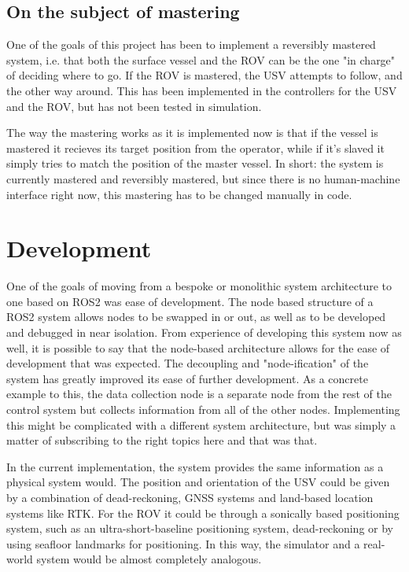 \documentclass[class=article, crop=false]{standalone}
\begin{document}
\subsection{On the subject of mastering}
One of the goals of this project has been to implement a reversibly mastered system, i.e. that both the surface vessel and the ROV can be the one "in charge" of deciding where to go. If the ROV is mastered, the USV attempts to follow, and the other way around. This has been implemented in the controllers for the USV and the ROV, but has not been tested in simulation.

The way the mastering works as it is implemented now is that if the vessel is mastered it recieves its target position from the operator, while if it's slaved it simply tries to match the position of the master vessel. In short: the system is currently mastered and reversibly mastered, but since there is no human-machine interface right now, this mastering has to be changed manually in code.

\section{Development}
One of the goals of moving from a bespoke or monolithic system architecture to one based on ROS2 was ease of development. The node based structure of a ROS2 system allows nodes to be swapped in or out, as well as to be developed and debugged in near isolation. From experience of developing this system now as well, it is possible to say that the node-based architecture allows for the ease of development that was expected. The decoupling and "node-ification" of the system has greatly improved its ease of further development. As a concrete example to this, the data collection node is a separate node from the rest of the control system but collects information from all of the other nodes. Implementing this might be complicated with a different system architecture, but was simply a matter of subscribing to the right topics here and that was that.

In the current implementation, the system provides the same information as a physical system  would. The position and orientation of the USV could be given by a combination of dead-reckoning, GNSS systems and land-based location systems like RTK. For the ROV it could be through a sonically based positioning system, such as an ultra-short-baseline positioning system, dead-reckoning or by using seafloor landmarks for positioning. In this way, the simulator and a real-world system would be almost completely analogous.
\end{document}
